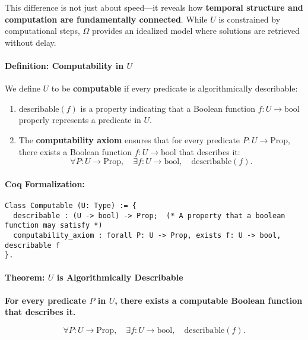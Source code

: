 \documentclass[12pt]{article}
\begin{document}
This difference is not just about speed—it reveals how \textbf{temporal structure and computation are fundamentally connected}. While \( U \) is constrained by computational steps, \( \Omega \) provides an idealized model where solutions are retrieved without delay.

\paragraph{Definition: Computability in \( U \)}
We define \( U \) to be \textbf{computable} if every predicate is algorithmically describable:

\begin{enumerate}
    \item \( \text{describable}(f) \) is a property indicating that a Boolean function \( f: U \to \text{bool} \) properly represents a predicate in \( U \).
    \item The \textbf{computability axiom} ensures that for every predicate \( P: U \to \text{Prop} \), there exists a Boolean function \( f: U \to \text{bool} \) that describes it:
    \begin{equation}
        \forall P: U \to \text{Prop}, \quad \exists f: U \to \text{bool}, \quad \text{describable}(f).
    \end{equation}
\end{enumerate}

\paragraph{Coq Formalization:}
\begin{lstlisting}[language=Coq]
Class Computable (U: Type) := {
  describable : (U -> bool) -> Prop;  (* A property that a boolean function may satisfy *)
  computability_axiom : forall P: U -> Prop, exists f: U -> bool, describable f
}.
\end{lstlisting}

\paragraph{Theorem: \( U \) is Algorithmically Describable}
\textbf{For every predicate \( P \) in \( U \), there exists a computable Boolean function that describes it.}

\begin{equation}
    \forall P: U \to \text{Prop}, \quad \exists f: U \to \text{bool}, \quad \text{describable}(f).
\end{equation}
\end{document}
